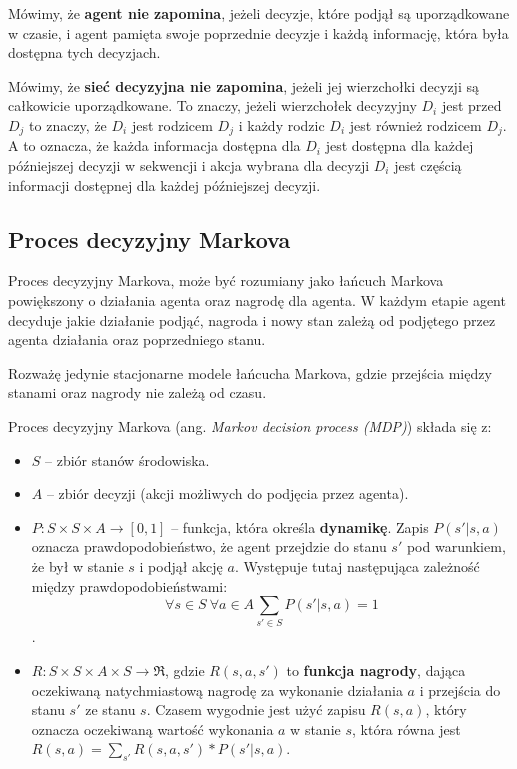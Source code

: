 \documentclass[a4paper, 12pt,twoside]{report}
\begin{document}
Mówimy, że \textbf{agent nie zapomina}, jeżeli decyzje, które podjął są
uporządkowane w czasie, i agent pamięta swoje poprzednie decyzje i każdą
informację, która była dostępna tych decyzjach.

Mówimy, że \textbf{sieć decyzyjna nie zapomina}, jeżeli jej wierzchołki decyzji
są całkowicie uporządkowane. To znaczy, jeżeli wierzchołek decyzyjny $D_i$ jest
przed $D_j$ to znaczy, że $D_i$ jest rodzicem $D_j$ i każdy rodzic $D_i$ jest
również rodzicem $D_j$. A to oznacza, że każda informacja dostępna dla $D_i$
jest dostępna dla każdej późniejszej decyzji w sekwencji i akcja wybrana dla
decyzji $D_i$ jest częścią informacji dostępnej dla każdej późniejszej decyzji.

\subsection{Proces decyzyjny Markova}
Proces decyzyjny Markova, może być rozumiany jako łańcuch Markova powiększony o
działania agenta oraz nagrodę dla agenta. W każdym etapie agent decyduje jakie
działanie podjąć, nagroda i nowy stan zależą od podjętego przez agenta
działania oraz poprzedniego stanu. 

Rozważę jedynie stacjonarne modele łańcucha Markova, gdzie przejścia między
stanami oraz nagrody nie zależą od czasu. 

Proces decyzyjny Markova (ang. \textit{Markov decision process (MDP)}) składa
się z:
\begin{itemize}
		\setlength\itemsep{-0.4em}
	\item $S$ -- zbiór stanów środowiska.
	\item $A$ -- zbiór decyzji (akcji możliwych do podjęcia przez agenta).
	\item $P: S\times S\times A\rightarrow [0,1]$ -- funkcja, która określa
		\textbf{dynamikę}. Zapis $P(s' | s, a)$ oznacza
		prawdopodobieństwo, że agent przejdzie do stanu $s'$ pod
		warunkiem, że był w stanie $s$ i podjął akcję $a$. Występuje
		tutaj następująca zależność między prawdopodobieństwami:
		\[\forall s\in S \ \forall a\in A \sum_{s' \in S}P(s'|s,a)=1\].
	\item $R:S\times S\times A\times S \rightarrow \mathfrak{R}$, gdzie
		$R(s,a,s')$ to \textbf{funkcja nagrody}, dająca oczekiwaną
		natychmiastową nagrodę za wykonanie działania $a$ i przejścia
		do stanu $s'$ ze stanu $s$. Czasem wygodnie jest użyć zapisu
		$R(s,a)$, który oznacza oczekiwaną wartość wykonania $a$ w
		stanie $s$, która równa jest
		$R(s,a)=\sum _{s'}R(s,a,s') * P(s'|s,a)$.
\end{itemize}
\end{document}
